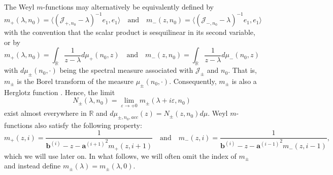 \documentclass[a4paper,reqno,twoside]{amsart}
\numberwithin{equation}{section}
\theoremstyle{definition}
\newcommand{\bseq}[2]{{\bm{#1}^{(#2)}}}
\newcommand{\<}{\ensuremath \leq}
\renewcommand{\>}{\ensuremath \geq}
\renewcommand{\epsilon}{\varepsilon}
\begin{document}
The Weyl $m$-functions may alternatively be equivalently defined by
\begin{equation}
    m_+(\lambda,n_0) = \langle(\mathcal {J}_{+,n_0}-\lambda)^{-1}e_1,e_1\rangle \quad \text{and}\quad m_-(z,n_0) = \langle(\mathcal {J}_{-,n_0}-\lambda)^{-1}e_1,e_1\rangle
\end{equation}
 with the convention that the scalar product is sesquilinear in its second variable, or by
\begin{equation}
    m_+(\lambda,n_0) = \int_\mathbb{R}\frac{1}{z-\lambda}d\mu_+(n_0,z) \quad \text{and}\quad m_-(z,n_0) = \int_\mathbb{R}\frac{1}{z-\lambda}d\mu_-(n_0,z)
\end{equation}
with $d\mu_\pm(n_0,\cdot)$ being the spectral measure associated with $\mathcal{J_\pm}$ and $n_0$. That is, $m_\pm$ is the Borel transform of the measure $\mu_\pm(n_0,\cdot)$. Consequently,  $m_\pm$  is also a Herglotz function \cite{damanik.fillman2022OneDimensional, Teschl1999-dz}. Hence, the limit
\begin{equation}
    N_\pm(\lambda,n_0) = \lim_{\epsilon\rightarrow+0}m_\pm(\lambda + i\epsilon,n_0)
\end{equation}
exist almost everywhere in $\mathbb{R}$ and $d\mu_{\pm,n_0,acc}(z) = N_\pm(z,n_0)d\mu$.
Weyl $m$-functions also satisfy the following property:
\begin{equation}\label{eq: m_represetation}
    m_+(z,i) = \frac{1}{\bseq{b}{i} - z -\bseq{a}{i+1}^2 m_+(z,i+1)}\quad \text{and} \quad m_-(z,i) = \frac{1}{\bseq{b}{i}-z-\bseq{a}{i-1}^2m_-(z,i-1)},
\end{equation}
which we will use later on. In what follows, we will often omit the index of $m_\pm$ and instead define $m_\pm(\lambda) = m_\pm(\lambda,0).$



\end{document}
